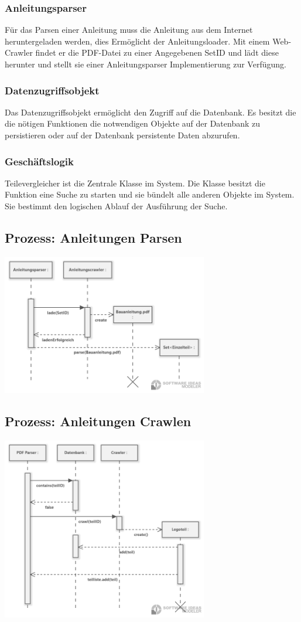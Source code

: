 \subsubsection{Anleitungsparser}
Für das Parsen einer Anleitung muss die Anleitung aus dem Internet heruntergeladen werden, dies Ermöglicht der Anleitungsloader. Mit einem Web-Crawler findet er die PDF-Datei zu einer Angegebenen SetID und lädt diese herunter und stellt sie einer Anleitungsparser Implementierung zur Verfügung. 

\subsubsection{Datenzugriffsobjekt}
Das Datenzugriffsobjekt ermöglicht den Zugriff auf die Datenbank. Es besitzt die die nötigen Funktionen die notwendigen Objekte auf der Datenbank zu persistieren oder auf der Datenbank persistente Daten abzurufen. 

\subsubsection{Geschäftslogik}
Teilevergleicher ist die Zentrale Klasse im System.  Die Klasse besitzt die Funktion eine Suche zu starten und sie bündelt alle anderen Objekte im System. Sie bestimmt den logischen Ablauf der Ausführung der Suche.\newpage 
\subsection{Prozess: Anleitungen Parsen}
\includegraphics[width=9cm]{pictures/9.Sequenzdiagramm.png}
\subsection{Prozess: Anleitungen Crawlen}
\includegraphics[width=9cm]{pictures/9.Sequenzdiagramm2.png}
